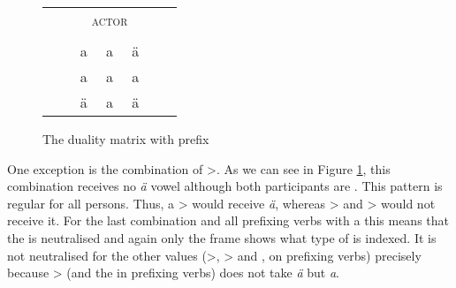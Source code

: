 \begin{figure}
	\begin{tabular}{|ccccccc|}
		\cline{3-5}
		\multicolumn{2}{c|}{}&\multicolumn{3}{c|}{\textsc{actor}}&\\\cline{3-5}
		\multicolumn{2}{c|}{}&\multicolumn{1}{c}{\Sg}&\multicolumn{1}{|c|}{\Du}&\multicolumn{1}{c|}{\Pl}&\\\cline{1-5}
		{\parbox[t]{2mm}{}}&\multicolumn{1}{|c|}{\parbox[t]{2mm}{}}&\multicolumn{1}{c}{\multirow{2}{*}{\,a\,}}	&\multirow{2}{*}{\,a\,}	&\multicolumn{1}{c|}{\multirow{2}{*}{\,ä\,}}&\\
		&\multicolumn{1}{|c|}{}&&&\multicolumn{1}{c|}{}\\\cline{2-2}
		&\multicolumn{1}{|c|}{\parbox[t]{2mm}{}}&\multicolumn{1}{c}{\multirow{2}{*}{\,a\,}}&\multirow{2}{*}{\,a\,}&\multicolumn{1}{c|}{\multirow{2}{*}{\,a\,}}&\\
		&\multicolumn{1}{|c|}{}&&&\multicolumn{1}{c|}{}\\\cline{2-2}
		&\multicolumn{1}{|c|}{\parbox[t]{2mm}{}}&\multicolumn{1}{c}{\multirow{2}{*}{\,ä\,}}&\multirow{2}{*}{\,a\,}&\multicolumn{1}{c|}{\multirow{2}{*}{\,ä\,}}&\\
		&\multicolumn{1}{|c|}{}&&&\multicolumn{1}{c|}{}\\\cline{1-5}
	\end{tabular}
\caption{The duality matrix with {\Vc} prefix}
\label{raezeroraevalchange}
\end{figure}%

One exception is the combination of \Sg>{\Sg}. As we can see in Figure \ref{raezeroraevalchange}, this combination receives no \emph{ä} vowel although both participants are . This pattern is regular for all persons. Thus, a \Pl>\Tsg{} would receive \emph{ä}, whereas \Du>\Tsg{} and \Sg>\Tsg{} would not receive it. For the last combination and all prefixing verbs with a \Tsg{} this means that the  is neutralised and again only the  frame shows what type of  is indexed. It is not neutralised for the other  values (\Sg>\Fsg{}, \Sg>\Ssg{} and \Fsg{}, \Ssg{} on prefixing verbs) precisely because \Sg>{\Sg} (and the {\Sg} in prefixing verbs) does not take \emph{ä} but \emph{a}.

